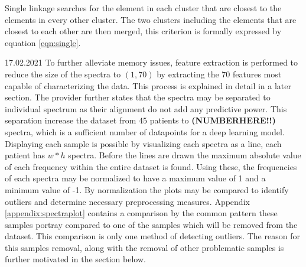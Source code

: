 Single linkage searches for the element in each cluster that are closest to the elements in every other cluster. The two clusters including the elements that are closest to each other are then merged, this criterion is formally expressed by equation \ref{eqn:single}.

 
 17.02.2021
To further alleviate memory issues, feature extraction is performed to reduce the size of the spectra to $(1, 70)$ by extracting the 70 features most capable of characterizing the data. This process is explained in detail in a later section. The provider further states that the spectra may be separated to individual spectrum as their alignment do not add any predictive power. This separation increase the dataset from $45$ patients to \textbf{(NUMBERHERE!!)} spectra, which is a sufficient number of datapoints for a deep learning model. Displaying each sample is possible by visualizing each spectra as a line, each patient has $w * h$ spectra. Before the lines are drawn the maximum absolute value of each frequency within the entire dataset is found. Using these, the frequencies of each spectra may be normalized to have a maximum value of 1 and a minimum value of -1. By normalization the plots may be compared to identify outliers and determine necessary preprocessing measures. Appendix \ref{appendix:spectraplot} contains a comparison by the common pattern these samples portray compared to one of the samples which will be removed from the dataset. This comparison is only one method of detecting outliers. The reason for this samples removal, along with the removal of other problematic samples is further motivated in the section below.
